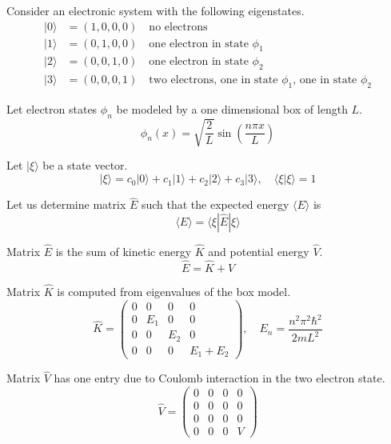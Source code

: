 \documentclass[12pt]{article}
\begin{document}
Consider an electronic system with the following eigenstates.
\begin{align*}
|0\rangle&=(1,0,0,0)\quad\text{no electrons}\\
|1\rangle&=(0,1,0,0)\quad\text{one electron in state $\phi_1$}\\
|2\rangle&=(0,0,1,0)\quad\text{one electron in state $\phi_2$}\\
|3\rangle&=(0,0,0,1)\quad\text{two electrons, one in state $\phi_1$, one in state $\phi_2$}
\end{align*}

Let electron states $\phi_n$ be modeled by a one dimensional box of length $L$.
\begin{equation*}
\phi_n(x)=\sqrt{\frac{2}{L}}\sin\left(\frac{n\pi x}{L}\right)
\end{equation*}

Let $|\xi\rangle$ be a state vector.
\begin{equation*}
|\xi\rangle=c_0|0\rangle+c_1|1\rangle+c_2|2\rangle+c_3|3\rangle,\quad\langle\xi|\xi\rangle=1
\end{equation*}

Let us determine matrix $\hat{E}$ such that the expected
energy $\langle E \rangle$ is
\begin{equation*}
\langle E\rangle=\langle\xi|\hat{E}|\xi\rangle
\end{equation*}

Matrix $\hat{E}$ is the sum of kinetic energy $\hat K$ and potential energy $\hat V$.
\begin{equation*}
\hat{E}=\hat{K}+\hat{V}
\end{equation*}

Matrix $\hat{K}$ is computed from eigenvalues of the box model.
\begin{equation*}
\hat{K}=\begin{pmatrix}
0 & 0 & 0 & 0\\
0 & E_1 & 0 & 0\\
0 & 0 & E_2 & 0\\
0 & 0 & 0 & E_1+E_2
\end{pmatrix},
\quad
E_n=\frac{n^2\pi^2\hbar^2}{2mL^2}
\end{equation*}

Matrix $\hat{V}$ has one entry due to Coulomb interaction in the two electron state.
\begin{equation*}
\hat{V}=
\begin{pmatrix}
0 & 0 & 0 & 0\\
0 & 0 & 0 & 0\\
0 & 0 & 0 & 0\\
0 & 0 & 0 & V
\end{pmatrix}
\end{equation*}
\end{document}
